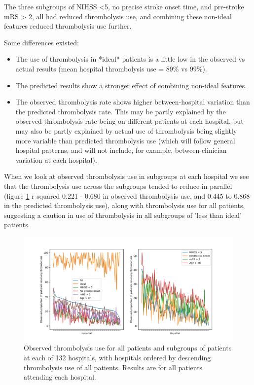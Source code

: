 The three subgroups of NIHSS <5, no precise stroke onset time, and pre-stroke mRS > 2, all had reduced thrombolysis use, and combining these non-ideal features reduced thrombolysis use further.

Some differences existed:

\begin{itemize}
    \item The use of thrombolysis in *ideal* patients is a little low in the observed vs actual results (mean hospital thrombolysis use = 89\% vs 99\%).
    \item The predicted results show a stronger effect of combining non-ideal features.
    \item The observed thrombolysis rate shows higher between-hospital variation than the predicted thrombolysis rate. This may be partly explained by the observed thrombolysis rate being on different patients at each hospital, but may also be partly explained by actual use of thrombolysis being slightly more variable than predicted thrombolysis use (which will follow general hospital patterns, and will not include, for example, between-clinician variation at each hospital).
\end{itemize}

When we look at observed thrombolysis use in subgroups at each hospital we see that the thrombolysis use across the subgroups tended to reduce in parallel (figure \ref{fig:subgroup_rate_1} r-squared 0.221 - 0.680 in observed thrombolysis use, and 0.445 to 0.868 in the predicted thrombolysis use), along with thrombolysis use for all patients, suggesting a  caution in use of thrombolysis in all subgroups of 'less than ideal' patients. 

\begin{figure}
\centering
\includegraphics[width=1\textwidth]{./images/15a_actual_subgroup}
\caption{Observed thrombolysis use for all patients and subgroups of patients at each of 132 hospitals, with hospitals ordered by descending thrombolysis use of all patients. Results are for all patients attending each hospital.}
\label{fig:subgroup_rate_1}
\end{figure}

